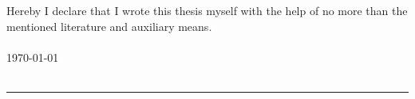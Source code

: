 Hereby I declare that I wrote this thesis myself with the help of no
more than the mentioned literature and auxiliary means.
\\\\
\today
\\\\
\begin{flushright}
\rule{5cm}{0.15mm}
\end{flushright}